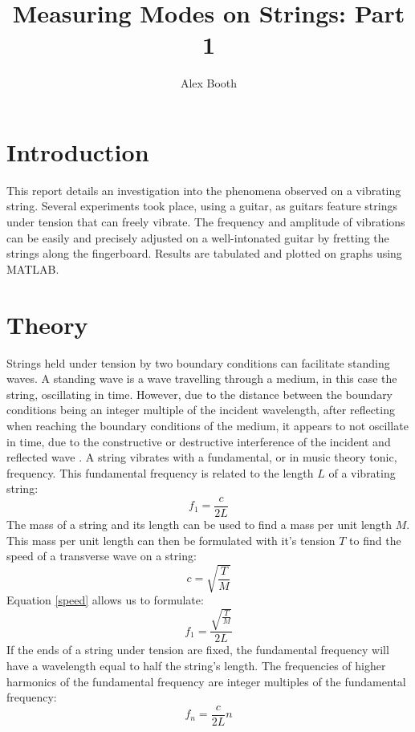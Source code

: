 \documentclass[11pt]{article}
\title{Measuring Modes on Strings: Part 1}
\author{Alex Booth}
\begin{document}
    \maketitle

    \section{Introduction}
        This report details an investigation into the phenomena observed on a vibrating string.
        Several experiments took place, using a guitar, as guitars feature strings under tension that can freely vibrate.
        The frequency and amplitude of vibrations can be easily and precisely adjusted on a well-intonated guitar by fretting the strings along the fingerboard.
        Results are tabulated and plotted on graphs using MATLAB. 
    
    \section{Theory}
        Strings held under tension by two boundary conditions can facilitate standing waves.
        A standing wave is a wave travelling through a medium, in this case the string, oscillating in time.
        However, due to the distance between the boundary conditions being an integer multiple of the incident wavelength, after reflecting when reaching the boundary conditions of the medium, it appears to not oscillate in time, due to the constructive or destructive interference of the incident and reflected wave \cite{STWAVES20, PHYS15}.
        A string vibrates with a fundamental, or in music theory tonic, frequency.
        This fundamental frequency is related to the length $L$ of a vibrating string:
        \begin{equation}
            f_1 = \frac{c}{2 L}
        \end{equation}
        The mass of a string and its length can be used to find a mass per unit length $M$.
        This mass per unit length can then be formulated with it's tension $T$ to find the speed of a transverse wave on a string:
        \begin{equation}\label{speed}
            c = \sqrt{\frac{T}{M}}
        \end{equation}
        Equation \ref{speed} allows us to formulate:
        \begin{equation}\label{fund}
            f_1 = \frac{\sqrt{\frac{T}{M}}}{2 L}
        \end{equation}
        If the ends of a string under tension are fixed, the fundamental frequency will have a wavelength equal to half the string's length.
        The frequencies of higher harmonics of the fundamental frequency are integer multiples of the fundamental frequency:
        \begin{equation}\label{harm}
            f_n = \frac{c}{2 L} n
        \end{equation}
\end{document}
